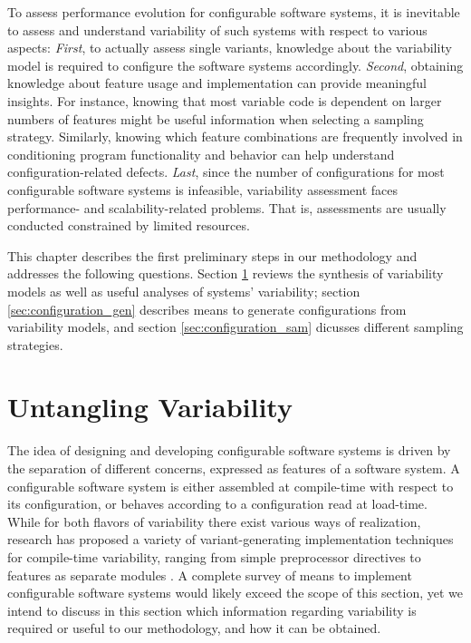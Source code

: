 To assess performance evolution for configurable software systems, it is
inevitable to assess and understand variability of such systems with respect to
various aspects: \emph{First}, to actually assess single variants, knowledge
about the variability model is required to configure the software systems accordingly.
\emph{Second}, obtaining knowledge about feature usage and implementation can
provide meaningful insights. For instance, knowing that most variable code is dependent
on larger numbers of features might be useful information when selecting a
sampling strategy. Similarly, knowing which feature combinations are frequently
involved in conditioning program functionality and behavior can help understand
configuration-related defects. \emph{Last}, since the number of configurations
for most configurable software systems is infeasible, variability assessment faces
performance- and scalability-related problems. That is, assessments are usually
conducted constrained by limited resources.

This chapter describes the first preliminary steps in our methodology and
addresses the following questions. Section \ref{sec:untangling} reviews the synthesis of
variability models as well as useful analyses of systems' variability; section
\ref{sec:configuration_gen} describes means to generate configurations from variability
models, and section \ref{sec:configuration_sam} dicusses different sampling
strategies.

\section{Untangling Variability}\label{sec:untangling}
The idea of designing and developing configurable software systems is driven by
the separation of different concerns, expressed as features of a software
system. A configurable software system is either assembled at compile-time with
respect to its configuration, or behaves according to a configuration read at
load-time. While for both flavors of variability there exist various ways of
realization, research has proposed a variety of variant-generating
implementation techniques for compile-time variability, ranging from simple
preprocessor directives to features as separate modules
\citep{kastner_model_2009}.  A complete survey of means to implement
configurable software systems would likely exceed the scope of this section, yet we intend to discuss in this
section which information regarding variability is required or useful to our
methodology, and how it can be obtained.

